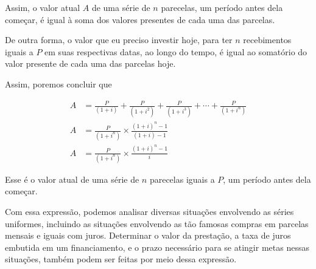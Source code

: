 Assim, o valor atual $A$ de uma série de $n$ parecelas, um período antes dela começar, é igual à soma dos valores presentes de cada uma das parcelas.

De outra forma, o valor que eu preciso investir hoje, para ter $n$ recebimentos iguais a $P$ em suas respectivas datas, ao longo do tempo, é igual ao somatório do valor presente de cada uma das parcelas hoje.

Assim, poremos concluir que

\begin{align*}
A&=\frac{P}{(1+i)}+\frac{P}{(1+i^2)}+\frac{P}{(1+i^3)}+\cdots+\frac{P}{(1+i^n)}\\
A&=\frac{P}{(1+i^n)}\times\frac{(1+i)^n-1}{(1+i)-1}\\
A&=\frac{P}{(1+i^n)}\times\frac{(1+i)^n-1}{i}
\end{align*}

Esse é o valor atual de uma série de $n$ parecelas iguais a $P$, um período antes dela começar.

Com essa expressão, podemos analisar diversas situações envolvendo as séries uniformes, incluindo as situações envolvendo as tão famosas compras em parcelas mensais e iguais com juros. Determinar o valor da prestação, a taxa de juros embutida em um financiamento, e o prazo necessário para se atingir metas nessas situações, também podem ser feitas por meio dessa expressão.

\clearpage

